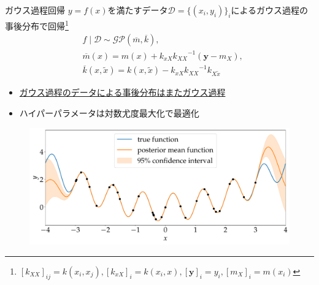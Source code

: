 \begin{frame}{ガウス過程回帰}
$y=f(x)$を満たすデータ$\mathcal{D}=\{(x_{i},y_{i})\}_{i}$によるガウス過程の事後分布で回帰\footnote{$[k_{XX}]_{ij}=k(x_{i},x_{j}),[k_{xX}]_{i}=k(x_{i},x),[\bm{y}]_{i}=y_{i},[m_{X}]_{i}=m(x_{i})$}
\begin{align*}
  &f\mid\mathcal{D}\sim\mathcal{GP}(\overline{m},\overline{k}),\\
  &\overline{m}(x)=m(x)+k_{xX}{k_{XX}}^{-1}(\bm{y}-m_{X}),\\
  &\overline{k}(x,\tilde{x})=k(x,\tilde{x})-k_{xX}{k_{XX}}^{-1}k_{X\tilde{x}}
\end{align*}
\begin{itemize}
  \item[\checkmark] \underline{ガウス過程のデータによる事後分布はまたガウス過程}
  \item[\checkmark] ハイパーパラメータは対数尤度最大化で最適化
\end{itemize}
\begin{figure}
  \includegraphics[height=0.35\textheight]{figs/gpr_sample.pdf}
\end{figure}
\end{frame}

